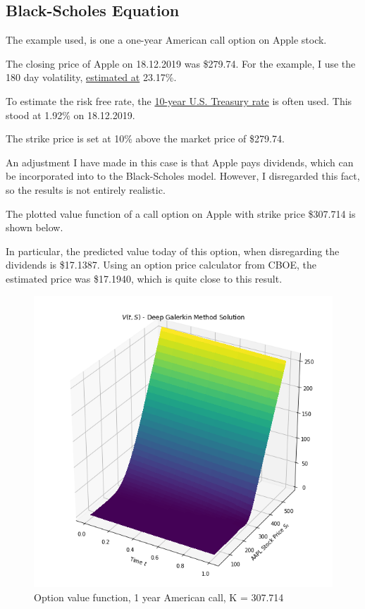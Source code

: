 \documentclass[]{article}
\begin{document}
\subsection{Black-Scholes Equation}\label{black-scholes-equation-1}

The example used, is one a one-year American call option on Apple stock.

The closing price of Apple on 18.12.2019 was \$279.74. For the example,
I use the 180 day volatility,
\href{https://www.alphaquery.com/stock/AAPL/volatility-option-statistics/180-day/historical-volatility}{estimated
at} 23.17\%.

To estimate the risk free rate, the
\href{https://ycharts.com/indicators/10_year_treasury_rate}{10-year U.S.
Treasury rate} is often used. This stood at 1.92\% on 18.12.2019.

The strike price is set at 10\% above the market price of \$279.74.

An adjustment I have made in this case is that Apple pays dividends,
which can be incorporated into to the Black-Scholes model. However, I
disregarded this fact, so the results is not entirely realistic.

The plotted value function of a call option on Apple with strike price
\$307.714 is shown below.

In particular, the predicted value today of this option, when
disregarding the dividends is \$17.1387. Using an option price
calculator from CBOE, the estimated price was \$17.1940, which is quite
close to this result.

\begin{figure}

{\centering \includegraphics[width=1\linewidth]{plots/Figure 9} 

}

\caption{Option value function, 1 year American call, K = 307.714}\label{fig:unnamed-chunk-6}
\end{figure}
\end{document}
